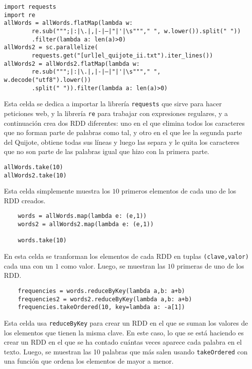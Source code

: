 \documentclass[11pt]{article}
\def\inline{\lstinline[basicstyle=\ttfamily,keywordstyle={}]}
\begin{document}
\begin{verbatim}
import requests
import re
allWords = allWords.flatMap(lambda w: 
        re.sub(""";|:|\.|,|-|–|"|'|\s"""," ", w.lower()).split(" "))
        .filter(lambda a: len(a)>0)
allWords2 = sc.parallelize(
        requests.get("[url]el_quijote_ii.txt").iter_lines())
allWords2 = allWords2.flatMap(lambda w: 
        re.sub(""";|:|\.|,|-|–|"|'|\s"""," ", w.decode("utf8").lower())
        .split(" ")).filter(lambda a: len(a)>0)
\end{verbatim}

Esta celda se dedica a importar la librería \inline{requests} que sirve para hacer peticiones web, y la librería \inline{re} para trabajar con expresiones regulares, y a continuación crea dos RDD diferentes: uno en el que elimina todos los caracteres que no forman parte de palabras como tal, y otro en el que lee la segunda parte del Quijote, obtiene todas sus líneas y luego las separa y le quita los caracteres que no son parte de las palabras igual que hizo con la primera parte.

\begin{verbatim}
allWords.take(10)
allWords2.take(10)
\end{verbatim}

Esta celda simplemente muestra los $10$ primeros elementos de cada uno de los RDD creados.


\begin{verbatim}
    words = allWords.map(lambda e: (e,1))
    words2 = allWords2.map(lambda e: (e,1))
    
    words.take(10)
\end{verbatim}

En esta celda se tranforman los elementos de cada RDD en tuplas \inline{(clave,valor)} cada una con un $1$ como valor. Luego, se muestran las $10$ primeras de uno de los RDD.

\begin{verbatim}
    frequencies = words.reduceByKey(lambda a,b: a+b)
    frequencies2 = words2.reduceByKey(lambda a,b: a+b)
    frequencies.takeOrdered(10, key=lambda a: -a[1])
\end{verbatim}

Esta celda usa \inline{reduceByKey} para crear un RDD en el que se suman los valores de los elementos que tienen la misma clave. En este caso, lo que se está haciendo es crear un RDD en el que se ha contado cuántas veces aparece cada palabra en el texto. Luego, se muestran las 10 palabras que más salen usando \inline{takeOrdered} con una función que ordena los elementos de mayor a menor.
\end{document}
